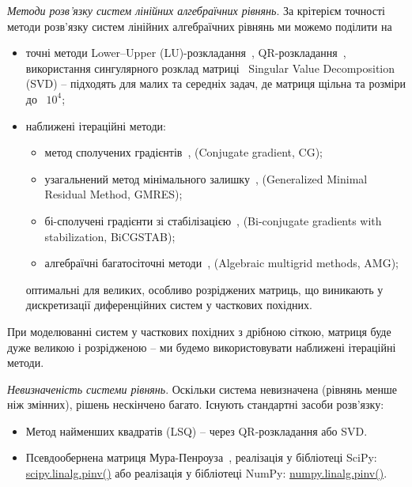 \textit{Методи розв'язку систем лінійних алгебраїчних рівнянь}. За крітерієм точності методи розв'язку систем лінійних алгебраїчних рівнянь
ми можемо поділити на
\begin{itemize}
    \item точні методи Lower–Upper (LU)-розкладання~\cite{Lay-Linear-Algebra-and-its-Applications},
    QR-розкладання~\cite{Holmes-Introduction-to-cientific-Computing-and-Data-Analysis}, використання сингулярного розклад матриці~\cite{Applications-of-the-singular-value-decomposition-in-dynamics}
    Singular Value Decomposition (SVD) -- підходять для малих та середніх задач, де матриця щільна та розміри до ~$10^4$;
    \item наближені ітераційні методи:
    \begin{itemize}
        \item метод сполучених градієнтів~\cite{Hestenes-Methods-of-conjugate-gradients}, (Conjugate gradient, CG);
        \item узагальнений метод мінімального залишку~\cite{Qinmeng-Zou-GMRES-algorithms-over-35-years}, (Generalized Minimal Residual Method, GMRES);
        \item бі-сполучені градієнти зі стабілізацією~\cite{Saad-Iterative-Methods-for-Sparse-Linear-Systems-2nd-ed},
        (Bi-conjugate gradients with stabilization, BiCGSTAB);
        \item алгебраїчні багатосіточні методи~\cite{Stüben-Algebraic-multigrid-AMG-experiences-and-comparisons}, (Algebraic multigrid methods, AMG);
    \end{itemize}
    оптимальні для великих, особливо розріджених матриць, що виникають у дискретизації диференційних систем у часткових похідних.
\end{itemize}
При моделюванні систем у часткових похідних з дрібною сіткою, матриця буде дуже великою і розрідженою -- ми будемо використовувати наближені ітераційні методи.

\textit{Невизначеність системи рівнянь}. Оскільки система невизначена (рівнянь менше ніж змінних), рішень нескінчено багато.
Існують стандартні засоби розв'язку:
\begin{itemize}
    \item Метод найменших квадратів (LSQ) – через QR-розкладання або SVD.
    \item Псевдообернена матриця Мура-Пенроуза~\cite{Penrose-A-generalized-inverse-for-matrices}, реалізація у бібліотеці SciPy: \href{https://docs.scipy.org/doc/scipy/reference/generated/scipy.linalg.pinv.html}{scipy.linalg.pinv()}
    або реалізація у бібліотеці NumPy: \href{https://numpy.org/doc/2.2/reference/generated/numpy.linalg.pinv.html}{numpy.linalg.pinv()}.
\end{itemize}

